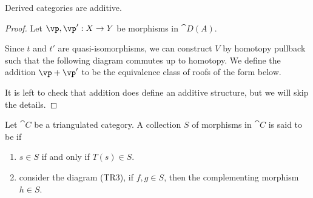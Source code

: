 \begin{proposition}
    Derived categories are additive.
\end{proposition}
\begin{proof}
    Let $\vp,\vp':X\to Y$ be morphisms in $\cat{D(A)}$. 
    \begin{center}
        \hspace{2.5cm}
    \end{center}
    Since $t$ and $t'$ are quasi-isomorphisms, we can construct $V$ by homotopy pullback such that the following diagram commutes up to homotopy. We define the addition $\vp+\vp'$ to be the equivalence class of roofs of the form below.
    \begin{center}
        \hspace{2.5cm}
    \end{center}
    It is left to check that addition does define an additive structure, but we will skip the details.
\end{proof}
\begin{definition}
    Let $\cat{C}$ be a triangulated category. A collection $S$ of morphisms in $\cat{C}$ is said to be  if 
    \begin{enumerate}
        \item $s\in S$ if and only if $T(s)\in S$.
        \item consider the diagram (TR3), if $f,g\in S$, then the complementing morphism $h\in S$.
    \end{enumerate}
\end{definition}
